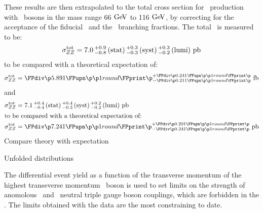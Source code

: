 These results are then extrapolated to the total cross section for \ZZ\
production with \Z\ bosons in the mass range 66$\GeV$ to 116$\GeV$, by
correcting for the acceptance of the fiducial \phasespace\ and the \Zll\
branching fractions. The total \cx\ is measured to be:
\begin{equation}
\sigma_{ZZ}^{\rm tot} = 7.0\, ^{+0.9}_{-0.8}\, \rm{(stat)}\, ^{+0.3}_{-0.3}\, \rm{(syst)}\, ^{+0.3}_{-0.2}\, \rm{(lumi)}~pb
\end{equation}
to be compared with a theoretical expectation of:
\begin{equation}
\sigmaTotZZ = \ZZSevenTeVTheoryTotalCrossSection
\end{equation}
and
\begin{align}
\sigmaTotZZ &= \ZZEightTeVTotalCrossSection \\
\intertext{to be compared with a theoretical expectation of:}
\sigmaTotZZ &= \ZZEightTeVTheoryTotalCrossSection
\end{align}
Compare theory with expectation

Unfolded distributions

The differential event yield as a function of the transverse momentum of the
highest transeverse momentum \Z\ boson is used to set limits on the strength of
anomolous \ZZZ\ and \ZZg\ neutral triple gauge boson couplings, which are
forbidden in the \sm. 
The limits obtained with the \sqrtseq{8} data are the most constraining to date.

